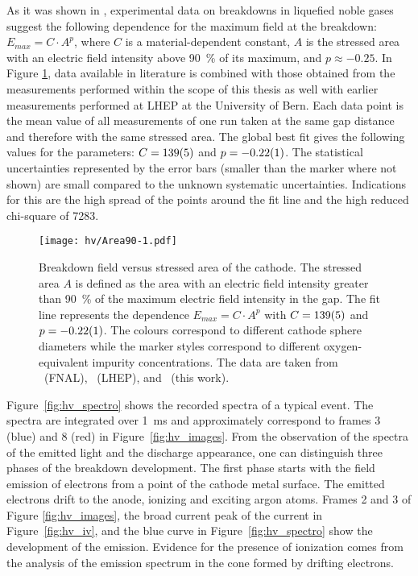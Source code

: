 As it was shown in \cite{FNAL-hv-paper, he-breakdown}, experimental data on breakdowns in liquefied noble gases suggest the following dependence for the maximum field at the breakdown: $E_{max}=C\cdot A^p$, where $C$ is a material-dependent constant, $A$ is the stressed area with an electric field intensity above \SI{90}{\percent} of its maximum, and $p\approx-0.25$.
In Figure \ref{fig:hv_powerplot}, data available in literature is combined with those obtained from the measurements performed within the scope of this thesis as well with earlier measurements performed at LHEP at the University of Bern.
Each data point is the mean value of all measurements of one run taken at the same gap distance and therefore with the same stressed area.
The global best fit gives the following values for the parameters: $C = \num{139 +- 5}$ and $p = \num{-0.22 +- 0.01}$.
The statistical uncertainties represented by the error bars (smaller than the marker where not shown) are small compared to the unknown systematic uncertainties.
Indications for this are the high spread of the points around the fit line and the high reduced chi-square of \num{7283}.

\begin{figure}[htb]
	\centering
	\texttt{[image: hv/Area90-1.pdf]}
	\caption{Breakdown field versus stressed area of the cathode. The stressed area $A$ is defined as the area with an electric field intensity greater than \SI{90}{\percent} of the maximum electric field intensity in the gap. The fit line represents the dependence $E_{max}=C\cdot A^p$ with $C = \num{139 +- 5}$ and $p = \num{-0.22 +- 0.01}$. The colours correspond to different cathode sphere diameters while the marker styles correspond to different oxygen-equivalent impurity concentrations. The data are taken from \cite{FNAL-hv-paper}~(FNAL), \cite{breakdown_14}~(LHEP), and \cite{breakdown_16}~(this work).}
	\label{fig:hv_powerplot}
\end{figure}


Figure~\ref{fig:hv_spectro} shows the recorded spectra of a typical event.
The spectra are integrated over \SI{1}{\milli\second} and approximately correspond to frames \num{3} (blue) and \num{8} (red) in Figure~\ref{fig:hv_images}.
From the observation of the spectra of the emitted light and the discharge appearance, one can distinguish three phases of the breakdown development.
The first phase starts with the field emission of electrons from a point of the cathode metal surface.
The emitted electrons drift to the anode, ionizing and exciting argon atoms.
Frames \num{2} and \num{3} of Figure \ref{fig:hv_images}, the broad current peak of the current in Figure~\ref{fig:hv_iv}, and the blue curve in Figure~\ref{fig:hv_spectro} show the development of the emission.
Evidence for the presence of ionization comes from the analysis of the emission spectrum in the cone formed by drifting electrons.

